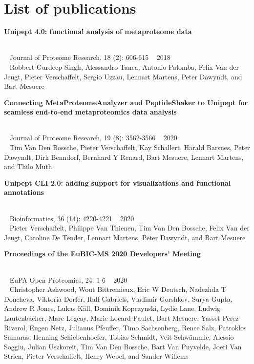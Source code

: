 \chapter*{List of publications}

\raggedbottom

\begin{large}\textbf{\textsf{Unipept 4.0: functional analysis of metaproteome data}}\end{large} \\
\faBook ~ \textsf{Journal of Proteome Research, 18 (2): 606-615} \hfill \faCalendar ~ \textsf{2018} \\
{
    \myriad
    \faUser ~ Robbert Gurdeep Singh, Alessandro Tanca, Antonio Palomba, Felix Van der Jeugt, \textsf{Pieter Verschaffelt}, Sergio Uzzau, Lennart Martens, Peter Dawyndt, and Bart Mesuere \\
}

\begin{large}\textbf{\textsf{Connecting MetaProteomeAnalyzer and PeptideShaker to Unipept for seamless end-to-end metaproteomics data analysis}}\end{large} \\
\faBook ~ \textsf{Journal of Proteome Research, 19 (8): 3562-3566} \hfill \faCalendar ~ \textsf{2020} \\
{
    \myriad
    \faUser ~ Tim Van Den Bossche, \textsf{Pieter Verschaffelt}, Kay Schallert, Harald Barsnes, Peter Dawyndt, Dirk Benndorf, Bernhard Y Renard, Bart Mesuere, Lennart Martens, and Thilo Muth \\
}

\begin{large}\textbf{\textsf{Unipept CLI 2.0: adding support for visualizations and functional annotations}}\end{large} \\
\faBook ~ \textsf{Bioinformatics, 36 (14): 4220-4221} \hfill \faCalendar ~ \textsf{2020} \\
{
    \myriad
    \faUser ~ \textsf{Pieter Verschaffelt}, Philippe Van Thienen, Tim Van Den Bossche, Felix Van der Jeugt, Caroline De Tender, Lennart Martens, Peter Dawyndt, and Bart Mesuere \\
}

\begin{large}\textbf{\textsf{Proceedings of the EuBIC-MS 2020 Developers' Meeting}}\end{large} \\
\faBook ~ \textsf{EuPA Open Proteomics, 24: 1-6} \hfill \faCalendar ~ \textsf{2020} \\
{
    \myriad
    \faUser ~ Christopher Ashwood, Wout Bittremieux, Eric W Deutsch, Nadezhda T Doncheva, Viktoria Dorfer, Ralf Gabriels, Vladimir Gorshkov, Surya Gupta, Andrew R Jones, Lukas Käll, Dominik Kopczynski, Lydie Lane, Ludwig Lautenbacher, Marc Legeay, Marie Locard-Paulet, Bart Mesuere, Yasset Perez-Riverol, Eugen Netz, Julianus Pfeuffer, Timo Sachsenberg, Renee Salz, Patroklos Samaras, Henning Schiebenhoefer, Tobias Schmidt, Veit Schwämmle, Alessio Soggiu, Julian Uszkoreit, Tim Van Den Bossche, Bart Van Puyvelde, Joeri Van Strien, \textsf{Pieter Verschaffelt}, Henry Webel, and Sander Willems \\
}

